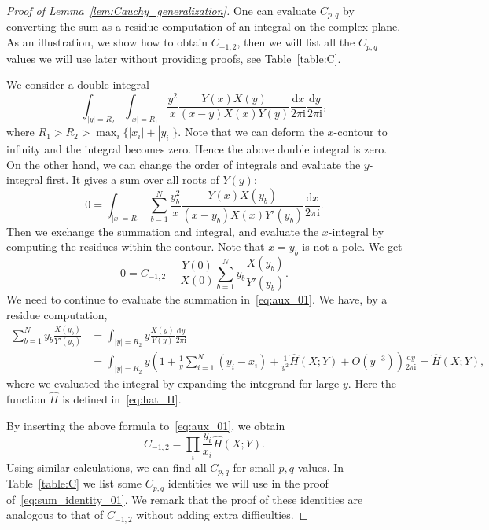 \documentclass[10pt,a4paper]{amsart}
\newcommand{\ddbar}[2]{\frac{{\mathrm d}#1}{2\pi {\mathrm i}#2}}
\begin{document}
\begin{proof}[Proof of Lemma~\ref{lem:Cauchy_generalization}]
One can evaluate $C_{p,q}$ by converting the sum as a residue computation of an integral on the complex plane. As an illustration, we show how to obtain $C_{-1,2}$, then we will list all the $C_{p,q}$ values we will use later without providing proofs, see Table~\ref{table:C}.

We consider a double integral
\begin{equation*}
	\int_{|y|=R_2} \int_{|x|=R_1} \frac{y^2}{x} \frac{Y(x)X(y)}{(x-y)X(x)Y(y)} \ddbar{x}{} \ddbar{y}{},
\end{equation*}
where $R_1>R_2> \max_i\{|x_i|+|y_i|\}$. Note that we can deform the $x$-contour to infinity and the integral becomes zero. Hence the above double integral is zero. On the other hand, we can change the order of integrals and evaluate the $y$-integral first. It gives a sum over all roots of $Y(y)$:
\begin{equation*}
	0= \int_{|x|=R_1} \sum_{b=1}^N \frac{y_b^2}{x} \frac{Y(x)X(y_b)}{(x-y_b) X(x) Y'(y_b)} \ddbar{x}{}.
\end{equation*}
Then we exchange the summation and integral, and evaluate the $x$-integral by computing the residues within the contour. Note that $x=y_b$ is not a pole. We get
\begin{equation}
	\label{eq:aux_01}
	0=C_{-1,2} -\frac{Y(0)}{X(0)} \sum_{b=1}^N y_b\frac{X(y_b)}{Y'(y_b)}.
\end{equation}
We need to continue to evaluate the summation in~\eqref{eq:aux_01}. We have, by a residue computation,
\begin{equation*}
	\begin{split}
	\sum_{b=1}^N y_b\frac{X(y_b)}{Y'(y_b)}&= \int_{|y|=R_2}y\frac{X(y)}{Y(y)}\ddbar{y}{}\\
	&= \int_{|y|=R_2} y\left(1+\frac{1}{y}\sum_{i=1}^N(y_i-x_i)+\frac{1}{y^2}\hat H(X;Y) +O(y^{-3})\right)\ddbar{y}{}
	 = \hat H(X;Y),
\end{split}
\end{equation*}
where we evaluated the integral by expanding the integrand for large $y$. Here the function $\hat H$ is defined in~\eqref{eq:hat_H}. 

By inserting the above formula to~\eqref{eq:aux_01}, we obtain
\begin{equation*}
	C_{-1,2}=\prod_i\frac{y_i}{x_i}\hat H(X;Y).
\end{equation*}
Using similar calculations, we can find all $C_{p,q}$ for small $p,q$ values. In Table~\ref{table:C} we list some $C_{p,q}$ identities we will use in the proof of~\eqref{eq:sum_identity_01}. We remark that the proof of these identities are analogous to that of $C_{-1,2}$ without adding extra difficulties.


\end{proof}
\end{document}
